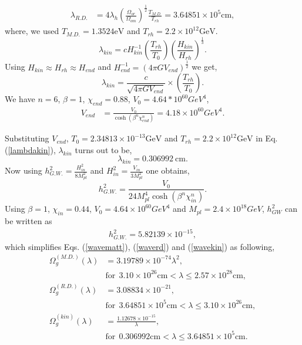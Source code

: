 \documentclass[prd,twocolumn,superscriptaddress]{revtex4}
\begin{document}
\begin{appendices}
\begin{align}
\lambda_{R.D.} &=4 \lambda_h {\left( \frac{\Omega_{or}}{\Omega_{om}} \right)}^{\frac{1}{2}} 
\frac{T_{M.D.}}{T_{rh}}= 3.64851 \times 10^{5} \mbox{cm},   
\end{align}
where, we used $T_{M.D.}=1.3524 \mbox{eV}$ and $T_{rh}=2.2 \times 10^{12} \mbox{GeV}$.
\begin{equation}
\lambda_{kin} = c H^{-1}_{kin} \left( \frac{T_{rh}}{T_0} \right) { \left( \frac{H_{kin}}{H_{rh}} \right) }^{\frac{1}{3}}.
\end{equation}
Using $H_{kin} \approx H_{rh} \approx H_{end}$ and $H_{end}^{-1} = \left( 4 \pi G V_{end} \right)^{\frac{1}{2}}$ we get,
\begin{equation}
\lambda_{kin} = \frac{c}{\sqrt{4 \pi G V_{end}}} \times \left( \frac{T_{rh}}{T_0} \right). \label{lambdakin}
\end{equation}
We have $n = 6$, $\beta = 1$, $\chi_{end} = 0.88$, $V_0 = 4.64 * 10^{60} GeV^4$,  
\begin{align}
V_{end} &= \frac{V_0}{\cosh{\left( \beta^n \chi_{end}^n \right)}} = 4.18 \times 10^{60} GeV^4 . 
\end{align}
  
Substituting $V_{end}$, $T_0 =2.34813 \times 10^{-13} \mbox{GeV}$ and $T_{rh}=2.2 \times 10^{12} \mbox{GeV}$
in Eq. (\ref{lambdakin}), $\lambda_{kin}$ turns out to be,
\begin{equation}
\lambda_{kin} =  0.306992 \ \mbox{cm}.
\end{equation}
Now using $h_{G.W.}^2 = \frac{H_{in}^2}{8 M_{pl}^2}$ and $H_{in}^2 = \frac{V_{in}}{3 M_{pl}^2}$ one obtains,
\begin{equation}
h_{G.W.}^2 = \frac{V_0}{24 M_{pl}^4 \cosh \left( \beta^n \chi_{in}^n \right)}.
\end{equation} 
Using $\beta = 1$, $\chi_{in} = 0.44$, $V_0 = 4.64 \times 10^{60} GeV^4$ and $M_{pl} = 2.4 \times 10^{18} GeV$,
$h_{GW}^2$ can be written as
\begin{align}
h_{G.W.}^2 = 5.82139 \times 10^{-15},
\end{align}
which simplifies Eqs. (\ref{wavematt}), (\ref{waverd}) and (\ref{wavekin}) as following,
\begin{align}
\Omega_g^{(M.D.)} (\lambda) &= 3.19789 \times 10^{-74} \lambda^2, \ \nonumber \\ 
& \mbox{for} \ \ 3.10 \times 10^{26} \mbox{cm} < \lambda \leq 2.57 \times 10^{28} \mbox{cm} , \\
\Omega_g^{(R.D.)} (\lambda) &= 3.08834 \times 10^{-21}, \ \nonumber \\ 
& \mbox{for} \ \ 3.64851 \times 10^5 \mbox{cm} < \lambda \leq 3.10 \times 10^{26} \mbox{cm} , \\
\Omega_g^{(kin)} (\lambda) &= \frac{1.12678 \times 10^{-15}}{\lambda}, \ \nonumber \\
& \mbox{for} \ \ 0.306992 \mbox{cm} < \lambda \leq 3.64851 \times 10^5 \mbox{cm}.
\end{align}

\end{appendices}
\end{document}
